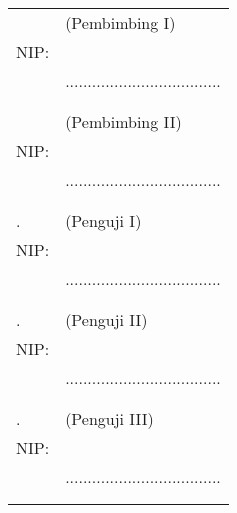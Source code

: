 \noindent
\begin{tabularx}{\textwidth}{X l}
  \advisor{}               & (Pembimbing I)                      \\
  NIP: \advisornip{}       &                                     \\
                           & ................................... \\
                           &                                     \\
                           &                                     \\
  \coadvisor{}             & (Pembimbing II)                     \\
  NIP: \coadvisornip{}     &                                     \\
                           & ................................... \\
                           &                                     \\
                           &                                     \\
  \examinerone{}.          & (Penguji I)                         \\
  NIP: \examineronenip{}   &                                     \\
                           & ................................... \\
                           &                                     \\
                           &                                     \\
  \examinertwo{}.          & (Penguji II)                        \\
  NIP: \examinertwonip{}   &                                     \\
                           & ................................... \\
                           &                                     \\
                           &                                     \\
  \examinerthree{}.        & (Penguji III)                       \\
  NIP: \examinerthreenip{} &                                     \\
                           & ................................... \\
                           &                                     \\
                           &                                     \\
\end{tabularx}
\endgroup


